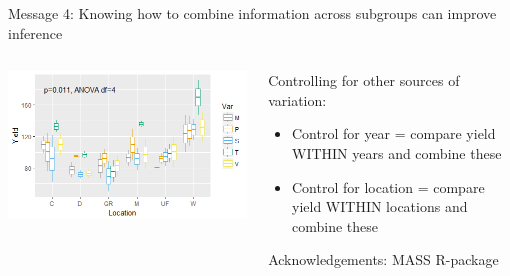 \documentclass{beamer}
\begin{document}
\begin{frame}{Message 4: Knowing how to combine information across subgroups  can improve inference}
 
  \begin{columns}
    \begin{column}{0.5\textwidth}
	\begin{center}
	\includegraphics[width=\textwidth]{Figures/message4d}
	\end{center}
    \end{column}
    
    \begin{column}{0.5\textwidth}
    \begin{block}{Controlling for other sources of variation:}
      \begin{itemize}
	\item Control for year = compare yield WITHIN years and combine these
	\item Control for location = compare yield WITHIN locations and combine these
      \end{itemize}
      \end{block}
      \tiny Acknowledgements: MASS R-package
    \end{column}
  \end{columns}
   
\end{frame}
\end{document}
